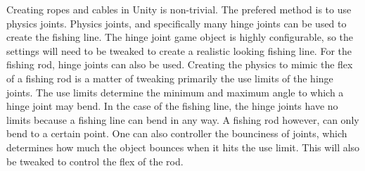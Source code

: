 \documentclass[10pt,journal,compsoc,onecolumn, draftclsnofoot]{IEEEtran}
\begin{document}
Creating ropes and cables in Unity is non-trivial.
The prefered method is to use physics joints.
Physics joints, and specifically many hinge joints can be used to create the fishing line.
The hinge joint game object is highly configurable, so the settings will need to be tweaked to create a realistic looking fishing line.
For the fishing rod, hinge joints can also be used.
Creating the physics to mimic the flex of a fishing rod is a matter of tweaking primarily the use limits of the hinge joints.
The use limits determine the minimum and maximum angle to which a hinge joint may bend.
In the case of the fishing line, the hinge joints have no limits because a fishing line can bend in any way.
A fishing rod however, can only bend to a certain point.
One can also controller the bounciness of joints, which determines how much the object bounces when it hits the use limit.
This will also be tweaked to control the flex of the rod.



\end{document}
